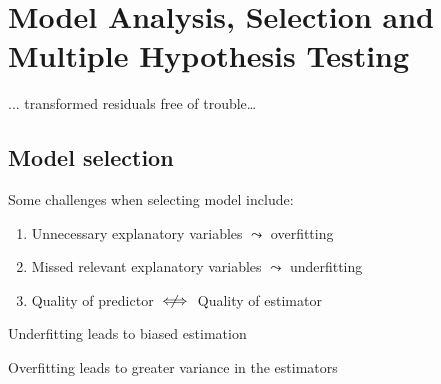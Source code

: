\section{Model Analysis, Selection and Multiple Hypothesis Testing}



... transformed residuals free of trouble\dots
{}

\subsection{Model selection}
Some challenges when selecting model include:
\begin{enumerate}
    \item Unnecessary explanatory variables $\leadsto$ overfitting
    \item Missed relevant explanatory variables $\leadsto$ underfitting
    \item Quality of predictor $\centernot\iff$ Quality of estimator
\end{enumerate}


Underfitting leads to biased estimation

Overfitting leads to greater variance in the estimators

